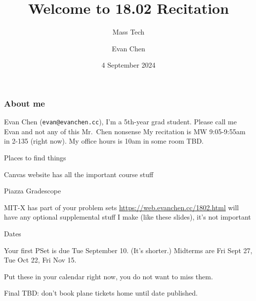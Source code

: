 \documentclass[11pt]{beamer}
\title{Welcome to 18.02 Recitation}
\subtitle{Mass Tech}
\author{Evan Chen}
\date{4 September 2024}
\begin{document}
\begin{frame}
  \maketitle
\end{frame}

\begin{frame}
  \frametitle{About me}
  \begin{itemize}
    \ii Evan Chen (\texttt{evan@evanchen.cc}), I'm a 5th-year grad student.
    \ii Please call me Evan and not any of this Mr.\ Chen nonsense
    \ii My recitation is MW 9:05-9:55am in 2-135 (right now).
    \ii My office hours is 10am in some room TBD.
  \end{itemize}
\end{frame}

\begin{frame}
  \begin{block}{Places to find things}
    \begin{itemize}
      \ii Canvas website has all the important course stuff
      \begin{itemize}
        \ii Piazza
        \ii Gradescope
      \end{itemize}
      \ii MIT-X has part of your problem sets
      \ii \url{https://web.evanchen.cc/1802.html} will have any
      optional supplemental stuff I make (like these slides), it's \alert{not} important
    \end{itemize}
  \end{block}
  \begin{block}{Dates}
    \begin{itemize}
      \ii Your first PSet is due Tue September 10. (It's shorter.)
      \ii Midterms are \alert{Fri Sept 27}, \alert{Tue Oct 22}, \alert{Fri Nov 15}.
      \begin{itemize}
        \ii Put these in your calendar right now, you do not want to miss them.
      \end{itemize}
      \ii Final TBD: don't book plane tickets home until date published.
    \end{itemize}
  \end{block}
\end{frame}
\end{document}

